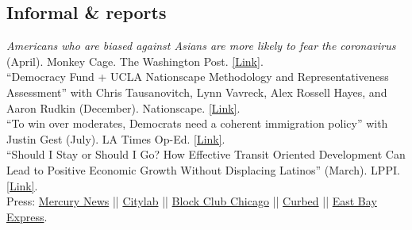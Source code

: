 \documentclass[11pt, a4paper]{article}
\newcommand{\years}[1]{\marginnote{\scriptsize #1}}
\begin{document}
\subsection*{Informal \& reports}

\years{2020}\textit{Americans who are biased against Asians are more likely to fear the coronavirus} (April). Monkey Cage. The Washington Post. \href{https://www.washingtonpost.com/politics/2020/04/01/americans-who-are-biased-against-asians-are-more-likely-fear-coronavirus/}{[Link]}.\\
\years{2019} ``Democracy Fund + UCLA
Nationscape Methodology and Representativeness Assessment'' with Chris Tausanovitch, Lynn Vavreck, Alex Rossell Hayes, and Aaron Rudkin (December). Nationscape. \href{https://www.voterstudygroup.org/download?lv=R9WVD6NcOZQVNZoKZOIRbASygr6H4fSnrLZ158RPvbx17XUGELPaq0KolDijyiTyN205aY805eFc2jdEul4iEsakXrQ50jcWVze58Hkn1FW6gSjR6OGY3IlQbtx6e%252BLQv0KjZJFudeXzYDWxzy6DuUdGxT2zwj0q8BzOOCMb3R%252Bx0Nz%252FlTNV9hE%252Fl8MgnTER0JU1SoCrk3o2mWygPDFDQBAEZixF4SmfssUk9Sl62Gd26KlJIInDvQ1j%252BAql0lUR}{[Link]}.\\
\years{2018} ``To win over moderates, Democrats need a coherent immigration policy'' with Justin Gest (July). LA Times Op-Ed. \href{http://www.latimes.com/opinion/op-ed/la-oe-gest-reny-immigration-policy-democrats-20180720-story.html}{[Link]}.\\
\years{} ``Should I Stay or Should I Go? How Effective Transit Oriented Development Can Lead to Positive Economic Growth Without Displacing Latinos'' (March). LPPI. \href{http://latino.ucla.edu/}{[Link]}.\\
\indent Press: 
\indent \href{https://www.mercurynews.com/2018/03/29/development-without-gentrification-oaklands-fruitvale-is-the-model-report-says/}{Mercury News} || 
\indent \href{https://www.citylab.com/equity/2018/04/how-transit-oriented-development-can-prevent-displacement/556373/?utm_source=twb%3Futm_source%3Dfbb}{Citylab} || \indent \href{https://blockclubchicago.org/2018/11/12/can-chicagos-gentrifying-neighborhoods-grow-without-leaving-longtime-residents-behind-oaklands-fruitvale-village-offers-hope/}{Block Club Chicago} ||
\indent \href{https://sf.curbed.com/2018/4/4/17198326/oakland-fruitvale-transit-village-housing-displacement-gentrification}{Curbed} || 
\indent \href{https://www.eastbayexpress.com/SevenDays/archives/2018/04/02/mondays-briefing-ucla-study-says-fruitvale-village-is-a-model-for-urban-planning-stephon-clark-protestor-struck-by-sacramento-sheriffs-veh}{East Bay Express}.\\
\end{document}
